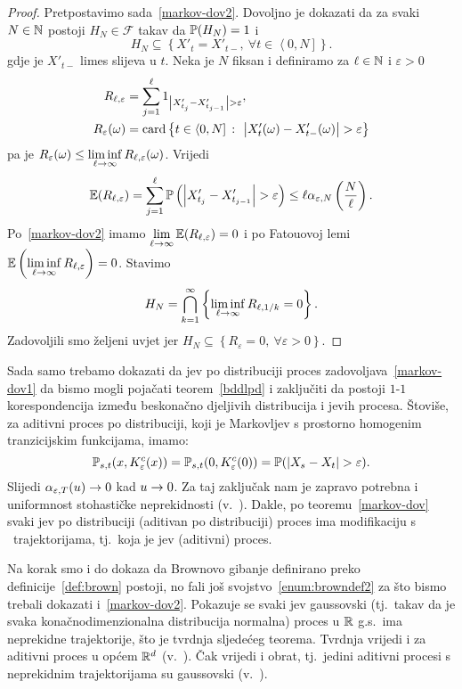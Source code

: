 \documentclass[main.tex]{subfiles}
\begin{document}
\begin{proof}
	Pretpostavimo sada~\eqref{markov-dov2}. Dovoljno je dokazati da za svaki \( N \in \N \)
	postoji \( H_N \in \mathcal F \) takav da \( \P(H_N)=1 \) i
	\[
		H_N \subseteq \left\{ X'_t = X'_{t-}, \ \forall t \in \left\langle 0,N \right] \right\}.
	\]
	gdje je \( X'_{t-} \) limes slijeva u \( t \). Neka je \( N \) fiksan i definiramo za \( \ell \in \N \) i \( \varepsilon > 0 \)
	\begin{align}
		R_{\ell, \varepsilon}   & = \sum_{j=1}^\ell 1_{\abs{X'_{t_j}-X'_{t_{j-1}}} > \varepsilon},                                            \\
		R_{\varepsilon}(\omega) & = \card \left\{ t \in \left\langle0, N\right] \st \abs{X'_t(\omega)-X'_{t-}(\omega)} > \varepsilon \right\}
	\end{align}
	pa je \( R_\varepsilon(\omega) \le \liminf\limits_{\ell \ub} R_{\ell, \varepsilon}(\omega) \). Vrijedi
	\begin{equation}
		\E(R_{\ell, \varepsilon}) =
		\sum_{j=1}^\ell \P\left(\abs{X'_{t_j} - X'_{t_{j-1}}} > \varepsilon\right) \le \ell \alpha_{\varepsilon, N}\left( \frac N\ell \right).
	\end{equation}
	Po~\eqref{markov-dov2} imamo \( \lim\limits_{\ell \ub} \E(R_{\ell, \varepsilon}) = 0 \) i po Fatouovoj lemi \( \E\left(\liminf\limits_{\ell \ub} R_{\ell, \varepsilon}\right) = 0 \). Stavimo
	\[
		H_N = \bigcap_{k=1}^\infty \left\{ \liminf\limits_{\ell \ub} R_{\ell, 1/k} = 0 \right\}.
	\]
	Zadovoljili smo željeni uvjet jer \( H_N \subseteq \left\{ R_\varepsilon = 0, \ \forall \varepsilon > 0 \right\} \).
\end{proof}
\bigskip
Sada samo trebamo dokazati da \levy jev po distribuciji proces zadovoljava~\eqref{markov-dov1} da
bismo mogli pojačati teorem~\ref{bddlpd} i zaključiti da postoji \( 1 \)-\( 1 \)
korespondencija između beskonačno djeljivih distribucija i \levy jevih procesa. Štoviše, za aditivni
proces po distribuciji, koji je Markovljev s prostorno homogenim tranzicijskim funkcijama, imamo:
\[
	\Ptrans_{s, t}(x, K_\varepsilon^c(x)) = \Ptrans_{s, t}(0, K_\varepsilon^c(0)) = \P(\abs{X_s-X_t} > \varepsilon).
\]
Slijedi \( \alpha_{\varepsilon, T}(u) \un \) kad \( u \un \). Za taj zaključak nam je zapravo
potrebna i uniformnost stohastičke neprekidnosti (v.~\cite[lema~9.6]{sato}). Dakle, po
teoremu~\ref{markov-dov} svaki \levy jev po distribuciji (aditivan po distribuciji)
proces ima modifikaciju s \cadlag \ trajektorijama, tj.\ koja je \levy jev (aditivni) proces.

Na korak smo i do dokaza da Brownovo gibanje definirano preko definicije~\ref{def:brown} postoji, no fali još svojstvo~\ref{enum:browndef2} za što bismo trebali dokazati
i~\eqref{markov-dov2}. Pokazuje se svaki \levy jev gaussovski (tj.\ takav da
je svaka konačnodimenzionalna distribucija normalna) proces u \( \R \) g.s.\ ima neprekidne trajektorije,
što je tvrdnja sljedećeg teorema. Tvrdnja vrijedi i za aditivni proces u općem \( \R^d \) (v.~\cite[tm.~11.7]{sato}). Čak vrijedi i obrat, tj.\ jedini aditivni procesi s neprekidnim trajektorijama su gaussovski (v.~\cite[]{sato}).
\end{document}
